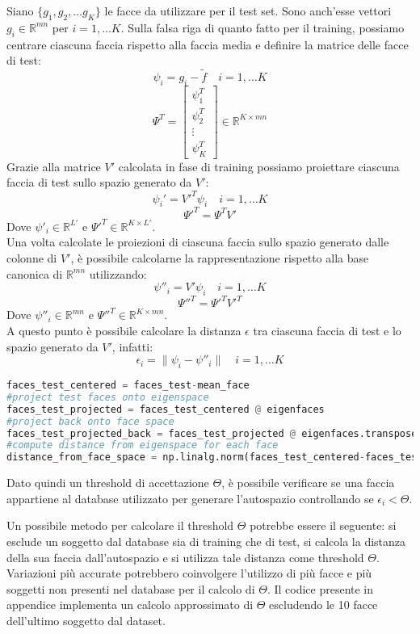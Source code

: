 Siano \(\{g_1, g_2, \dots g_K\}\) le facce da utilizzare per il test set. Sono anch'esse vettori \( g_i \in \mathbb{R}^{mn}\) per \(i = 1, \dots K\). Sulla falsa riga di quanto fatto per il training, possiamo centrare ciascuna faccia rispetto alla faccia media e definire la matrice delle facce di test:
\[
\psi_i = g_i - \tilde{f} \quad i = 1,\dots K    
\]
\[\Psi^T = \begin{bmatrix}
    \psi_1^T \\
    \psi_2^T \\
    \vdots \\
    \psi_K^T
\end{bmatrix} \in \mathbb{R}^{K \times mn}
    \]
Grazie alla matrice \(V'\) calcolata in fase di training possiamo proiettare ciascuna faccia di test sullo spazio generato da \(V'\):
\[
\psi_i' = V'^T \psi_i \quad i = 1,\dots K
\]
\[
    \Psi'^T = \Psi^T V'
\]
Dove \(\psi'_i \in \mathbb{R}^{L'}\) e \(\Psi'^T \in \mathbb{R}^{K \times L'}\). \\
Una volta calcolate le proiezioni di ciascuna faccia sullo spazio generato dalle colonne di \(V'\), è possibile calcolarne la rappresentazione  rispetto alla base canonica di \(\mathbb{R}^{mn}\) utilizzando:
\[
\psi''_i = V' \psi_i \quad i=1, \dots K    
\]
\[
\Psi''^T = \Psi'^T V'^T    
\]
Dove \(\psi''_i \in \mathbb{R}^{mn}\) e \(\Psi''^T \in \mathbb{R}^{K \times mn}\). \\
A questo punto è possibile calcolare la distanza \(\epsilon\) tra ciascuna faccia di test e lo spazio generato da \(V'\), infatti:
\[
\epsilon_i = \| \psi_i - \psi''_i \| \quad i = 1,\dots K     
\]
\begin{lstlisting}[language=Python]
faces_test_centered = faces_test-mean_face
#project test faces onto eigenspace
faces_test_projected = faces_test_centered @ eigenfaces 
#project back onto face space
faces_test_projected_back = faces_test_projected @ eigenfaces.transpose() 
#compute distance from eigenspace for each face
distance_from_face_space = np.linalg.norm(faces_test_centered-faces_test_projected_back, axis=1) 
\end{lstlisting}
Dato quindi un threshold di accettazione \(\Theta\), è possibile verificare se una faccia appartiene al database utilizzato per generare l'autospazio controllando se \(\epsilon_i < \Theta\).
\newpage
\begin{mdframed}
    Un possibile metodo per calcolare il threshold \(\Theta\) potrebbe essere il seguente: si esclude un soggetto dal database sia di training che di test, si calcola la distanza della sua faccia dall'autospazio e si utilizza tale distanza come threshold \(\Theta\). Variazioni più accurate potrebbero coinvolgere l'utilizzo di più facce e più soggetti non presenti nel database per il calcolo di \(\Theta\). Il codice presente in appendice implementa un calcolo approssimato di \(\Theta\) escludendo le 10 facce dell'ultimo soggetto dal dataset.
\end{mdframed}

